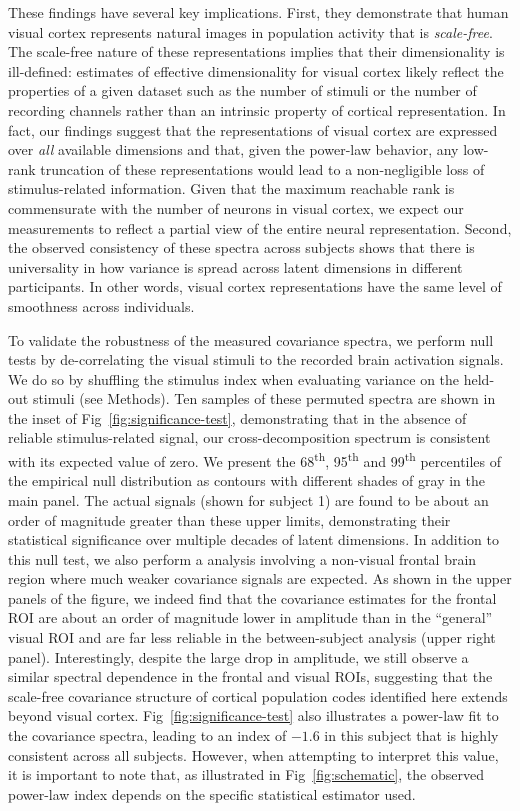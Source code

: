 \documentclass[10pt]{article}
\begin{document}
These findings have several key implications. First, they demonstrate that human visual cortex represents natural images in population activity that is \emph{scale-free}. The scale-free nature of these representations implies that their dimensionality is ill-defined: estimates of effective dimensionality for visual cortex likely reflect the properties of a given dataset such as the number of stimuli or the number of recording channels rather than an intrinsic property of cortical representation. In fact, our findings suggest that the representations of visual cortex are expressed over \emph{all} available dimensions and that, given the power-law behavior, any low-rank truncation of these representations would lead to a non-negligible loss of stimulus-related information. Given that the maximum reachable rank is commensurate with the number of neurons in visual cortex, we expect our measurements to reflect a partial view of the entire neural representation. Second, the observed consistency of these spectra across subjects shows that there is universality in how variance is spread across latent dimensions in different participants. In other words, visual cortex representations have the same level of smoothness across individuals.

To validate the robustness of the measured covariance spectra, we perform null tests by de-correlating the visual stimuli to the recorded brain activation signals. We do so by shuffling the stimulus index when evaluating variance on the held-out stimuli (see Methods). Ten samples of these permuted spectra are shown in the inset of Fig~\ref{fig:significance-test}, demonstrating that in the absence of reliable stimulus-related signal, our cross-decomposition spectrum is consistent with its expected value of zero. We present the 68\textsuperscript{th}, 95\textsuperscript{th} and 99\textsuperscript{th} percentiles of the empirical null distribution as contours with different shades of gray in the main panel. The actual signals (shown for subject 1) are found to be about an order of magnitude greater than these upper limits, demonstrating their statistical significance over multiple decades of latent dimensions. In addition to this null test, we also perform a analysis involving a non-visual frontal brain region where much weaker covariance signals are expected. As shown in the upper panels of the figure, we indeed find that the covariance estimates for the frontal ROI are about an order of magnitude lower in amplitude than in the ``general'' visual ROI and are far less reliable in the between-subject analysis (upper right panel). Interestingly, despite the large drop in amplitude, we still observe a similar spectral dependence in the frontal and visual ROIs, suggesting that the scale-free covariance structure of cortical population codes identified here extends beyond visual cortex. Fig~\ref{fig:significance-test} also illustrates a power-law fit to the covariance spectra, leading to an index of \(-1.6\) in this subject that is highly consistent across all subjects. However, when attempting to interpret this value, it is important to note that, as illustrated in Fig~\ref{fig:schematic}, the observed power-law index depends on the specific statistical estimator used.
\end{document}
